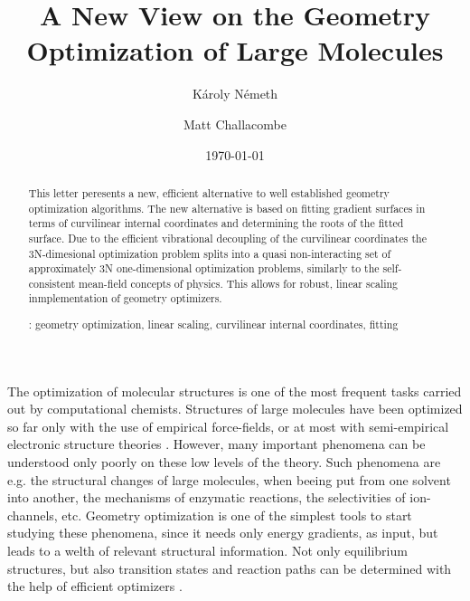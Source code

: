 \documentclass[prl,aps,twocolumn,showpacs,twocolumngrid,superbib]{revtex4}
\begin{document}
\title{
A New View on the Geometry Optimization of Large Molecules            
}

\author{K\'aroly N\'emeth}
\author{Matt Challacombe}


\date{\today}

\begin{abstract}
{
This letter peresents a new, efficient alternative to well established
geometry optimization algorithms. The new alternative is based on
fitting gradient surfaces in terms of curvilinear 
internal coordinates and 
determining the roots of the fitted surface. Due to the efficient 
vibrational decoupling of the curvilinear coordinates the 3N-dimesional
optimization problem splits into a quasi non-interacting
set of approximately 3N one-dimensional optimization problems, 
similarly to the self-consistent mean-field concepts of physics.
This allows for robust, linear scaling inmplementation of geometry optimizers.
}

\smallskip
{}: 
geometry optimization, linear scaling, 
curvilinear internal coordinates, fitting
\end{abstract}
 

\maketitle


The optimization of molecular structures is one of the most frequent
tasks carried out by computational chemists. 
Structures of large molecules have been optimized so far
only with the use of empirical force-fields, or at most with 
semi-empirical electronic structure theories 
\cite{Stewart_crambin_opt,Schlegel_plasminogen_opt}. However, many important phenomena
can be understood only poorly on these low levels of the theory. 
Such phenomena are e.g. the structural changes of large molecules, 
when beeing put from one solvent into another, the mechanisms of 
enzymatic reactions, the selectivities of ion-channels, etc. 
Geometry optimization is one of the simplest tools to start studying 
these phenomena, since it needs only energy gradients, as input, but 
leads to a welth of relevant structural information.
Not only equilibrium structures, but also transition states and reaction
paths can be determined with the help of efficient optimizers 
\cite{nudged_elastic_band}.
\end{document}
